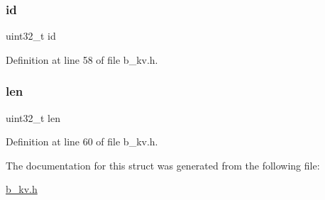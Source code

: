 \subsubsection{\texorpdfstring{id}{id}}
{\footnotesize\ttfamily uint32\+\_\+t id}



Definition at line 58 of file b\+\_\+kv.\+h.

\mbox{\label{structb_k_v___index__t_a96bbf959016e4411c9e6b9812a8be60a}} 
\subsubsection{\texorpdfstring{len}{len}}
{\footnotesize\ttfamily uint32\+\_\+t len}



Definition at line 60 of file b\+\_\+kv.\+h.



The documentation for this struct was generated from the following file\+:\begin{DoxyCompactItemize}
\item 
\mbox{\hyperlink{b__kv_8h}{b\+\_\+kv.\+h}}\end{DoxyCompactItemize}
